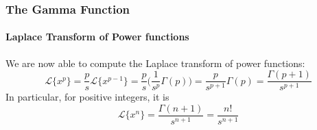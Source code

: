 \documentclass[9pt,xcolor=x11names,compress]{beamer}
\begin{document}
\begin{frame}\frametitle{The Gamma Function}
\framesubtitle{Laplace Transform of Power functions}
We are now able to compute the Laplace transform of power functions:
\begin{equation*}
	\mathcal{L}\{x^p\} = \frac{p}{s} \mathcal{L}\{x^{p-1}\} = \frac{p}{s} \Big(\frac{1}{s^p}\Gamma(p) \Big)	= \frac{p}{s^{p+1}}\Gamma(p)= \frac{\Gamma(p+1)}{s^{p+1}}
\end{equation*}
In particular, for positive integers, it is
\begin{equation*}
	\mathcal{L}\{x^n\} = \frac{\Gamma(n+1)}{s^{n+1}} = \frac{n!}{s^{n+1}}
\end{equation*}

\end{frame}
\end{document}
